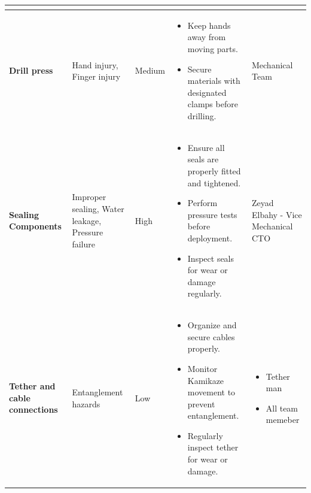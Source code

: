 \documentclass[conference , 12pt]{IEEEtran}
\begin{document}
\begin{longtable}{|p{3.5cm}|>{\raggedright}p{3.5cm}|p{1.5cm}|>{\raggedright}p{5cm}|p{3cm}|}
\begin{itemize}[leftmargin=*]
                    \end{itemize}                                                                                                                                                               \\
    \hline
    \textbf{Drill press}                                                                  & Hand injury, Finger injury                                             & Medium              &
    \begin{itemize}[leftmargin=*]
        \item Keep hands away from moving parts.
        \item Secure materials with designated clamps before drilling.
    \end{itemize}                        & Mechanical Team                                                                                                                                                                                      \\
    \hline
    \textbf{Sealing Components}                                                           & Improper sealing, Water leakage, Pressure failure                      & High                &
    \begin{itemize}[leftmargin=*]
        \item Ensure all seals are properly fitted and tightened.
        \item Perform pressure tests before deployment.
        \item Inspect seals for wear or damage regularly.
    \end{itemize}                             & Zeyad Elbahy - Vice Mechanical CTO                                                                                                                                                                     \\
    \hline
    \textbf{Tether and cable connections}                                                 & Entanglement hazards                                                   & Low                 &
    \begin{itemize}[leftmargin=*]
        \item Organize and secure cables properly.
        \item Monitor Kamikaze movement to prevent entanglement.
        \item Regularly inspect tether for wear or damage.
    \end{itemize}                              & \begin{itemize}[leftmargin=*] \item Tether man \item  \noindent All team memeber  \end{itemize}                                                                                                                                \\

\end{longtable}
\end{document}
